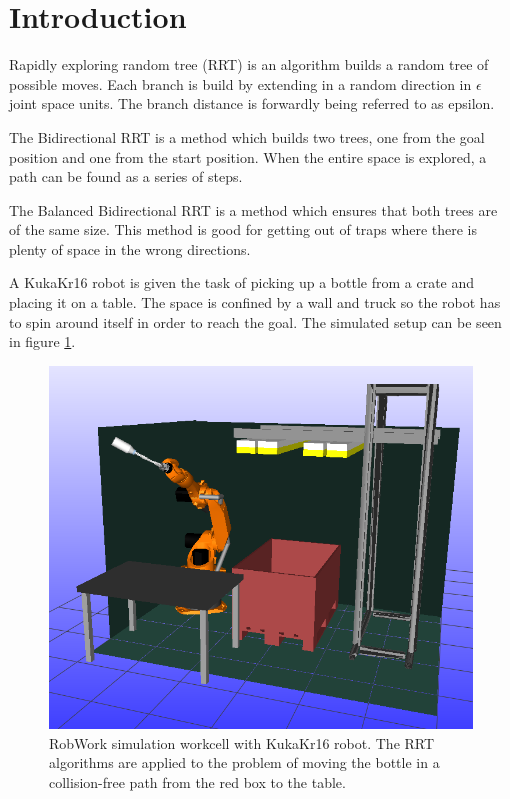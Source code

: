 \section{Introduction} 

Rapidly exploring random tree (RRT) is an algorithm builds a random tree of possible
moves. Each branch is build by extending in a random direction in \(\epsilon\) joint space units. The branch distance is
forwardly being referred to as epsilon. 

The Bidirectional RRT is a method which builds two trees, one from the goal position and one from the start position. 
When the entire space is explored, a path can be found as a series of steps.

The Balanced Bidirectional RRT is a method which ensures that both trees are of the same size. 
This method is good for getting out of traps where there is plenty of space in the wrong directions.

A KukaKr16 robot is given the task of picking up a bottle from a crate and placing it on a table.
The space is confined by a wall and truck so the robot has to spin around itself in order to reach the goal.
The simulated setup can be seen in figure \ref{fig:worckcell_bottle_picked}.

\begin{figure}[h]
 \centering
 \includegraphics[width=\figsize]{graphics/robworkpic}
 \caption{RobWork simulation workcell with KukaKr16 robot.
 The RRT algorithms are applied to the problem of moving the bottle
 in a collision-free path from the red box to the table.}
 \label{fig:worckcell_bottle_picked}
\end{figure}

